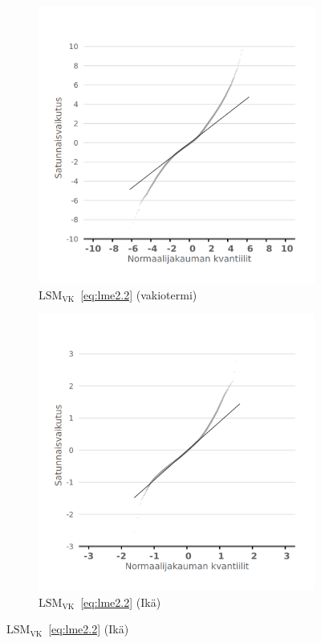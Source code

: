 \documentclass[finnish]{docopts}
\begin{document}
\begin{figure}[H]
\begin{subfigure}[b]{0.4\textwidth}
  \label{fig:lme_taysi_ika_qq}
\end{subfigure}
\begin{subfigure}[b]{0.4\textwidth}
\centering
  \includegraphics[width=.8\linewidth]{kuvaajat/lme3_vc_qq_ranef_int.png}
  \caption{$\text{LSM}_{\text{VK}}$~\ref{eq:lme2.2} (vakiotermi)}
  \label{fig:lme_vk_krit_int_qq}
\end{subfigure}%
\begin{subfigure}[b]{0.4\textwidth}
\centering
  \includegraphics[width=.8\linewidth]{kuvaajat/lme3_vc_qq_ranef_ika.png}
  \caption{$\text{LSM}_{\text{VK}}$~\ref{eq:lme2.2} (Ikä)}

\end{subfigure}
\end{figure}
\end{document}
